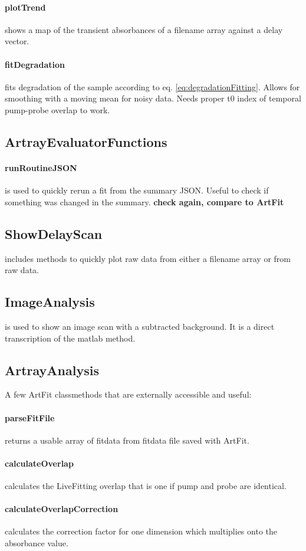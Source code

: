 \documentclass[twoside,openright]{scrreprt}
\begin{document}
\paragraph{plotTrend} shows a map of the transient absorbances of a filename array against a delay vector. 
\paragraph{fitDegradation} fits degradation of the sample according to eq. \ref{eq:degradationFitting}. Allows for smoothing with a moving mean for noisy data. Needs proper t0 index of temporal pump-probe overlap to work.
\subsection*{ArtrayEvaluatorFunctions}
\paragraph{runRoutineJSON} is used to quickly rerun a fit from the summary JSON. Useful to check if something was changed in the summary. \textbf{check again, compare to ArtFit}
\subsection*{ShowDelayScan} includes methods to quickly plot raw data from either a filename array or from raw data.
\subsection*{ImageAnalysis} is used to show an image scan with a subtracted background. It is a direct transcription of the matlab method.
\subsection*{ArtrayAnalysis}
A few ArtFit classmethods that are externally accessible and useful:
\paragraph{parseFitFile} returns a usable array of fitdata from fitdata file saved with ArtFit.
\paragraph{calculateOverlap} calculates the LiveFitting overlap that is one if pump and probe are identical.
\paragraph{calculateOverlapCorrection} calculates the correction factor for one dimension which multiplies onto the absorbance value.
\end{document}
